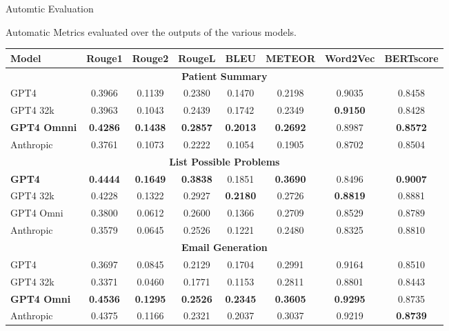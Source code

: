 \documentclass[usenames,dvipsnames]{beamer}
\begin{document}
\begin{frame}{Automtic Evaluation}
  
  Automatic Metrics evaluated over the outputs of the various models.

  \begin{table}[b]
    \centering
    \setlength{\extrarowheight}{2pt}
    \begin{tabular}{|l|c|c|c|c|c|c|c|}
    \hline
    Model & Rouge1 & Rouge2 & RougeL & BLEU & METEOR & Word2Vec & BERTscore \\
    \hline
    \multicolumn{8}{|c|}{\textbf{Patient Summary}} \\
    \hline
    GPT4      & 0.3966 & 0.1139 & 0.2380 & 0.1470 & 0.2198 & 0.9035 & 0.8458 \\
    GPT4 32k  & 0.3963 & 0.1043 & 0.2439 & 0.1742 & 0.2349 & \textbf{0.9150} & 0.8428 \\
    \textbf{GPT4 Omnni}     & \textbf{0.4286} & \textbf{0.1438} & \textbf{0.2857} & \textbf{0.2013} & \textbf{0.2692} & 0.8987 & \textbf{0.8572} \\
    Anthropic & 0.3761 & 0.1073 & 0.2222 & 0.1054 & 0.1905 & 0.8702 & 0.8504 \\
    \hline
    \multicolumn{8}{|c|}{\textbf{List Possible Problems}} \\
    \hline
    \textbf{GPT4}      & \textbf{0.4444} & \textbf{0.1649} & \textbf{0.3838} & 0.1851 & \textbf{0.3690} & 0.8496 & \textbf{0.9007} \\
    GPT4 32k  & 0.4228 & 0.1322 & 0.2927 & \textbf{0.2180} & 0.2726 & \textbf{0.8819} & 0.8881 \\
    GPT4 Omni     & 0.3800 & 0.0612 & 0.2600 & 0.1366 & 0.2709 & 0.8529 & 0.8789 \\
    Anthropic & 0.3579 & 0.0645 & 0.2526 & 0.1221 & 0.2480 & 0.8325 & 0.8810 \\
    \hline
    \multicolumn{8}{|c|}{\textbf{Email Generation}} \\
    \hline
    GPT4      & 0.3697 & 0.0845 & 0.2129 & 0.1704 & 0.2991 & 0.9164 & 0.8510 \\
    GPT4 32k  & 0.3371 & 0.0460 & 0.1771 & 0.1153 & 0.2811 & 0.8801 & 0.8443 \\
    \textbf{GPT4 Omni}     & \textbf{0.4536} & \textbf{0.1295} & \textbf{0.2526} & \textbf{0.2345} & \textbf{0.3605} & \textbf{0.9295} & 0.8735 \\
    Anthropic & 0.4375 & 0.1166 & 0.2321 & 0.2037 & 0.3037 & 0.9219 & \textbf{0.8739} \\
    \hline
    \end{tabular}
\end{table}



\end{frame}
\end{document}
